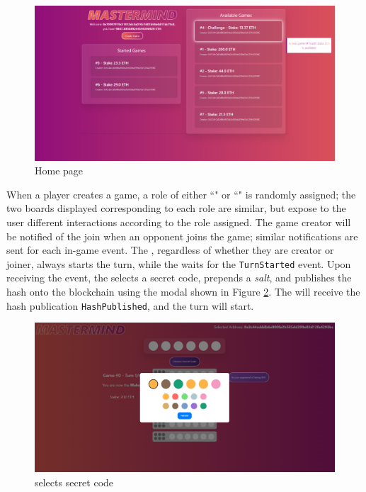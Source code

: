 \begin{figure}[htbp]
   \centering
   \includegraphics{images/home.PNG}
   \caption{Home page}
   \label{fig:home}
\end{figure}

\newpage
When a player creates a game, a role of either ``" or ``" is randomly assigned; the two boards displayed corresponding to each role are similar, but expose to the user different interactions according to the role assigned. The game creator will be notified of the join when an opponent joins the game; similar notifications are sent for each in-game event. 
The , regardless of whether they are creator or joiner, always starts the turn, while the  waits for the \texttt{TurnStarted} event. 
Upon receiving the event, the  selects a secret code, prepends a \textit{salt}, and publishes the hash onto the blockchain using the modal shown in Figure \ref{fig:maker_secret_code}.
The  will receive the hash publication \texttt{HashPublished}, and the turn will start.

\begin{figure}[htbp]
   \centering
   \includegraphics{images/board maker.PNG}
   \caption{ selects secret code}
   \label{fig:maker_secret_code}
\end{figure}

